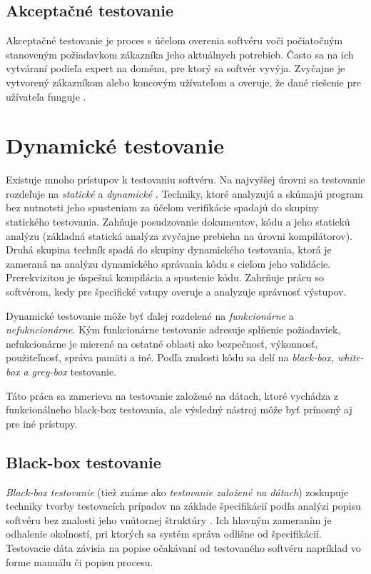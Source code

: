 \subsection*{Akceptačné testovanie}
Akceptačné testovanie je proces s účelom overenia softvéru voči počiatočným stanoveným požiadavkom zákazníka jeho aktuálnych potrebieb. Často sa na ich vytváraní podieľa expert na doménu, pre ktorý sa softvér vyvýja. Zvyčajne je vytvorený zákazníkom alebo koncovým užívateľom a overuje, že dané riešenie pre užívateľa funguje \cite{Ast}.  

\section{Dynamické testovanie}
\label{Dyn_t}
Existuje mnoho prístupov k testovaniu softvéru. Na najvyššej úrovni sa testovanie rozdeľuje na {\it statické} a {\it dynamické} \cite{Ist}. Techniky, ktoré analyzujú a skúmajú program bez nutnotsti jeho spusteniam za účelom verifikácie spadajú do skupiny statického testovania. Zahňuje posudzovanie dokumentov, kódu a jeho statickú analýzu (základná statická analýza zvyčajne prebieha na úrovni kompilátorov). Druhá skupina techník spadá do skupiny dynamického testovania, ktorá je zameraná na analýzu dynamického správania kôdu s cieľom jeho validácie. Prerekvizitou je úspešná kompilácia a spustenie kódu. Zahrňuje prácu so softvérom, kedy pre špecifické vstupy overuje a analyzuje správnosť výstupov.

 Dynamické testovanie môže byť ďalej rozdelené na {\it funkcionárne} a {\it nefukncionárne}. Kým funkcionárne testovanie adresuje splňenie požiadaviek, nefukcionárne je mierené na ostatné oblasti ako bezpečnosť, výkonnosť, použiteľnosť, správa pamäti a iné. Podľa znalosti kôdu sa delí na {\it black-box, white-box a grey-box} testovanie.
 
  Táto práca sa zamerieva na testovanie založené na dátach, ktoré vychádza z funkcionálneho black-box testovania, ale výsledný nástroj môže byť prínosný aj pre iné prístupy.

       
\subsection*{Black-box testovanie}
{\it Black-box testovanie} (tiež známe ako {\it testovanie založené na dátach}) zoskupuje techniky tvorby testovacích prípadov na základe špecifikácií podľa analýzi popisu softvéru bez znalosti jeho vnútornej štruktúry  \cite{Ast}. Ich hlavným zameraním je odhalenie okoľností, pri ktorých sa systém správa odlišne od špecifikácií.  Testovacie dáta závisia na popise očakávaní od testovaného softvéru napríklad vo forme manuálu či popisu procesu.

